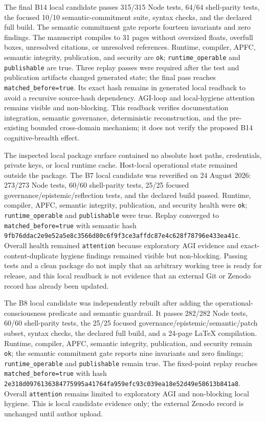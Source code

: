 \documentclass[10pt,twocolumn]{article}
\theoremstyle{definition}
\theoremstyle{plain}
\theoremstyle{remark}
\newcommand{\file}[1]{\nolinkurl{#1}}
\begin{document}
The final B14 local candidate passes 315/315 Node tests, 64/64 shell-parity tests, the focused 10/10 semantic-commitment suite, syntax checks, and the declared full build.  The semantic commitment gate reports fourteen invariants and zero findings.  The manuscript compiles to 31 pages without oversized floats, overfull boxes, unresolved citations, or unresolved references.  Runtime, compiler, APFC, semantic integrity, publication, and security are \file{ok}; \file{runtime\_operable} and \file{publishable} are true.  Three replay passes were required after the test and publication artifacts changed generated state; the final pass reaches \file{matched\_before=true}.  Its exact hash remains in generated local readback to avoid a recursive source-hash dependency.  AGI-loop and local-hygiene attention remains visible and non-blocking.  This readback verifies documentation integration, semantic governance, deterministic reconstruction, and the pre-existing bounded cross-domain mechanism; it does not verify the proposed B14 cognitive-breadth effect.

The inspected local package surface contained no absolute host paths, credentials, private keys, or local runtime cache.  Host-local operational state remained outside the package.  The B7 local candidate was reverified on 24 August 2026: 273/273 Node tests, 60/60 shell-parity tests, 25/25 focused governance/epistemic/reflection tests, and the declared build passed.  Runtime, compiler, APFC, semantic integrity, publication, and security health were \file{ok}; \file{runtime\_operable} and \file{publishable} were true.  Replay converged to \file{matched\_before=true} with semantic hash \file{9fb76ddac2e9e52a5e8c3566d80c6f9f3ce3affdc87e4c628f78796e433ea41c}.  Overall health remained \file{attention} because exploratory AGI evidence and exact-content-duplicate hygiene findings remained visible but non-blocking.  Passing tests and a clean package do not imply that an arbitrary working tree is ready for release, and this local readback is not evidence that an external Git or Zenodo record has already been updated.

The B8 local candidate was independently rebuilt after adding the operational-consciousness predicate and semantic guardrail.  It passes 282/282 Node tests, 60/60 shell-parity tests, the 25/25 focused governance/epistemic/semantic/patch subset, syntax checks, the declared full build, and a 24-page LaTeX compilation.  Runtime, compiler, APFC, semantic integrity, publication, and security remain \file{ok}; the semantic commitment gate reports nine invariants and zero findings; \file{runtime\_operable} and \file{publishable} remain true.  The fixed-point replay reaches \file{matched\_before=true} with hash \file{2e318d0976136384775995a41764fa959efc93c039ea18e52d49e58613b841a8}.  Overall \file{attention} remains limited to exploratory AGI and non-blocking local hygiene.  This is local candidate evidence only; the external Zenodo record is unchanged until author upload.
\end{document}
